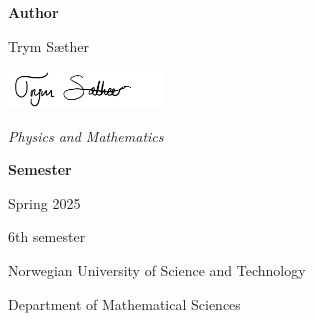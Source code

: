 \begin{titlepage}
    \begin{minipage}{0.48\textwidth}
        \begin{flushleft}
            \large
            {\color{ntnu-blue}\textbf{Author}}\par
            \vspace{0.2cm}
            Trym Sæther\par
            \vspace{0.3cm}
            \includegraphics[height=1cm]{preamble/frontmatter/TS_Signature.png}\par
            \vspace{0.3cm}
            {\color{ntnu-purple}\textit{Physics and Mathematics}}
        \end{flushleft}
    \end{minipage}
    \hfill
    \begin{minipage}{0.48\textwidth}
        \begin{flushright}
            \large
            {\color{ntnu-blue}\textbf{Semester}}\par
            \vspace{0.2cm}
            Spring 2025\par
            6th semester
        \end{flushright}
    \end{minipage}
    
    \vfill
    
    \begin{center}
        {\color{ntnu-blue}\sffamily\Large Norwegian University of Science and Technology}
        \vspace{0.4cm}
        
        {\sffamily\large Department of Mathematical Sciences}
    \end{center}
    
    \vspace{1cm}
\end{titlepage}
